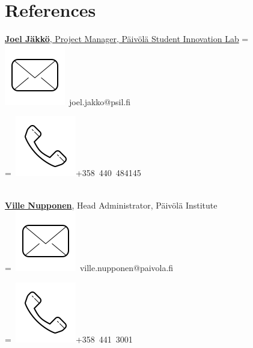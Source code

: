 \documentclass[]{plushcv}
\begin{document}
\begin{minipage}[t]{0.25\textwidth}
\section{References} 
\href{https://www.linkedin.com/in/joel-jakko/}{\textbf{Joel Jäkkö}, Project Manager, Päivölä Student Innovation Lab}
\begingroup
{}=\hbox{
\includegraphics[scale=0.1,trim={0 1cm 0cm 0cm}]{icons/main/mail.png}\hspace{0.3cm} joel.jakko@psil.fi
}
\parbox{\wd0}{}
\endgroup
\begingroup
{}=\hbox{
\includegraphics[scale=0.1,trim={0 1.25cm -0.4cm 0cm}]{icons/main/phone.png}\hspace{0.3cm}+358 440 484145
}
\parbox{\wd0}{}\endgroup
\\
\sectionsep
\href{https://github.com/aikain}{\textbf{Ville Nupponen}}, Head Administrator, Päivölä Institute 
\\
\begingroup
{}=\hbox{
\includegraphics[scale=0.1,trim={0 1cm 0cm 0cm}]{icons/main/mail.png}\hspace{0.3cm} ville.nupponen@paivola.fi
}
\parbox{\wd0}{}
\endgroup
\begingroup
{}=\hbox{
\includegraphics[scale=0.1,trim={0 1.25cm -0.4cm 0cm}]{icons/main/phone.png}\hspace{0.3cm}+358 441 3001
}
\parbox{\wd0}{}\endgroup
\\
\sectionsep

\end{minipage}
\end{document}
